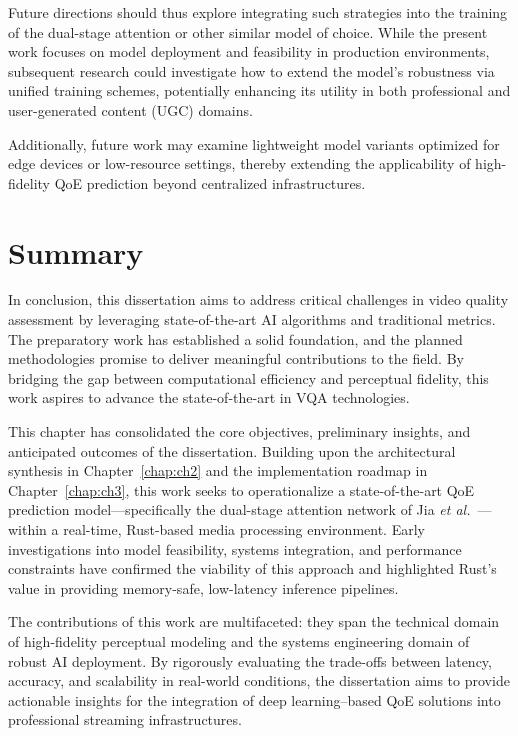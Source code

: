 Future directions should thus explore integrating such strategies into the training of the dual-stage attention or other similar model of choice. While the present work focuses on model deployment and feasibility in production environments, subsequent research could investigate how to extend the model’s robustness via unified training schemes, potentially enhancing its utility in both professional and user-generated content (UGC) domains.

Additionally, future work may examine lightweight model variants optimized for edge devices or low-resource settings, thereby extending the applicability of high-fidelity QoE prediction beyond centralized infrastructures.

\section{Summary}

In conclusion, this dissertation aims to address critical challenges in video quality assessment by leveraging state-of-the-art AI algorithms and traditional metrics. The preparatory work has established a solid foundation, and the planned methodologies promise to deliver meaningful contributions to the field. By bridging the gap between computational efficiency and perceptual fidelity, this work aspires to advance the state-of-the-art in VQA technologies.

This chapter has consolidated the core objectives, preliminary insights, and anticipated outcomes of the dissertation. Building upon the architectural synthesis in Chapter~\ref{chap:ch2} and the implementation roadmap in Chapter~\ref{chap:ch3}, this work seeks to operationalize a state-of-the-art QoE prediction model—specifically the dual-stage attention network of Jia \textit{et al.}~\cite{jia2024continuous}—within a real-time, Rust-based media processing environment. Early investigations into model feasibility, systems integration, and performance constraints have confirmed the viability of this approach and highlighted Rust’s value in providing memory-safe, low-latency inference pipelines.

The contributions of this work are multifaceted: they span the technical domain of high-fidelity perceptual modeling and the systems engineering domain of robust AI deployment. By rigorously evaluating the trade-offs between latency, accuracy, and scalability in real-world conditions, the dissertation aims to provide actionable insights for the integration of deep learning–based QoE solutions into professional streaming infrastructures.

